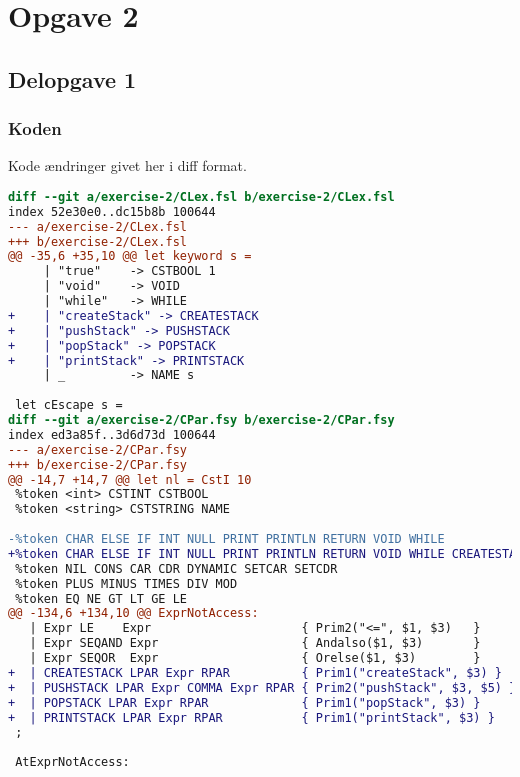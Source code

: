\section{Opgave 2}
\subsection{Delopgave 1}\label{ass:1-1}
\subsubsection{Koden}
Kode ændringer givet her i diff format.
\begin{lstlisting}[language=diff]
diff --git a/exercise-2/CLex.fsl b/exercise-2/CLex.fsl
index 52e30e0..dc15b8b 100644
--- a/exercise-2/CLex.fsl
+++ b/exercise-2/CLex.fsl
@@ -35,6 +35,10 @@ let keyword s =
     | "true"    -> CSTBOOL 1
     | "void"    -> VOID 
     | "while"   -> WHILE         
+    | "createStack" -> CREATESTACK
+    | "pushStack" -> PUSHSTACK
+    | "popStack" -> POPSTACK
+    | "printStack" -> PRINTSTACK
     | _         -> NAME s
  
 let cEscape s = 
diff --git a/exercise-2/CPar.fsy b/exercise-2/CPar.fsy
index ed3a85f..3d6d73d 100644
--- a/exercise-2/CPar.fsy
+++ b/exercise-2/CPar.fsy
@@ -14,7 +14,7 @@ let nl = CstI 10
 %token <int> CSTINT CSTBOOL
 %token <string> CSTSTRING NAME
 
-%token CHAR ELSE IF INT NULL PRINT PRINTLN RETURN VOID WHILE
+%token CHAR ELSE IF INT NULL PRINT PRINTLN RETURN VOID WHILE CREATESTACK PUSHSTACK POPSTACK PRINTSTACK
 %token NIL CONS CAR CDR DYNAMIC SETCAR SETCDR
 %token PLUS MINUS TIMES DIV MOD
 %token EQ NE GT LT GE LE
@@ -134,6 +134,10 @@ ExprNotAccess:
   | Expr LE    Expr                     { Prim2("<=", $1, $3)   }
   | Expr SEQAND Expr                    { Andalso($1, $3)       }
   | Expr SEQOR  Expr                    { Orelse($1, $3)        }
+  | CREATESTACK LPAR Expr RPAR          { Prim1("createStack", $3) }
+  | PUSHSTACK LPAR Expr COMMA Expr RPAR { Prim2("pushStack", $3, $5) }
+  | POPSTACK LPAR Expr RPAR             { Prim1("popStack", $3) }
+  | PRINTSTACK LPAR Expr RPAR           { Prim1("printStack", $3) }
 ;
 
 AtExprNotAccess:
\end{lstlisting}

